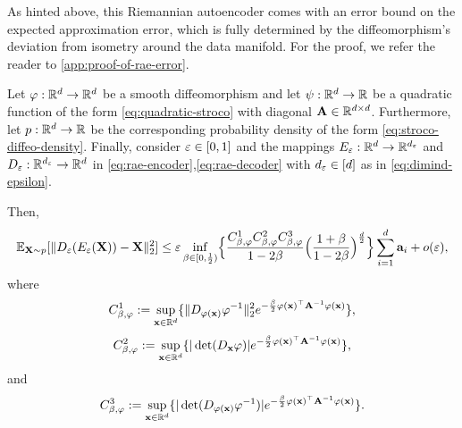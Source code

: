 As hinted above, this Riemannian autoencoder comes with an error bound on the expected approximation error, which is fully determined by the diffeomorphism’s deviation from isometry around the data manifold. For the proof, we refer the reader to \ref{app:proof-of-rae-error}.
\begin{theorem}
\label{thm:rae-error}
    Let $\varphi:\mathbb{R}^d \to \mathbb{R}^d$ be a smooth diffeomorphism and let $\psi: \mathbb{R}^d \to \mathbb{R}$ be a quadratic function of the form \ref{eq:quadratic-stroco} with diagonal $\mathbf{A} \in \mathbb{R}^{d\times d}$. Furthermore, let $p:\mathbb{R}^d \to\mathbb{R}$ be the corresponding probability density of the form \ref{eq:stroco-diffeo-density}. Finally, consider $\varepsilon\in [0,1]$ and the mappings $E_\varepsilon:\mathbb{R}^d \to \mathbb{R}^{d_\varepsilon}$ and $D_\varepsilon:\mathbb{R}^{d_\varepsilon} \to \mathbb{R}^d$ in \ref{eq:rae-encoder},\ref{eq:rae-decoder} with $d_\varepsilon \in [d]$ as in \ref{eq:dimind-epsilon}.

    Then, 
    \begin{equation}
        \mathbb{E}_{\mathbf{X} \sim p}[\| D_\varepsilon(E_\varepsilon(\mathbf{X}))-  \mathbf{X}\|_2^2] \leq \varepsilon \inf_{\beta\in [0,\frac{1}{2})}\Bigl\{  \frac{C^1_{\beta,\varphi} C^2_{\beta,\varphi} C^3_{\beta,\varphi}}{1 - 2\beta} \Bigl(\frac{1 + \beta}{1 - 2\beta} \Bigr)^{\frac{d}{2}} \Bigr\} \sum_{i=1}^{d} \mathbf{a}_{i} + o(\varepsilon),
        \label{eq:thm-rae-bound}
    \end{equation}
where 
\begin{equation}
    C^1_{\beta,\varphi} := \sup_{\mathbf{x}\in \mathbb{R}^{d}} \{ \| D_{\varphi(\mathbf{x})} \varphi^{-1}\|_2^2 e^{-\frac{\beta}{2} \varphi(\mathbf{x})^\top \mathbf{A}^{-1} \varphi(\mathbf{x}) } \},
    \label{eq:RAEinvdiffeoRegConstantB}
\end{equation}
\begin{equation}
    C^2_{\beta,\varphi} := \sup_{\mathbf{x}\in \mathbb{R}^{d}} \{ |\det (D_{\mathbf{x}} \varphi)| e^{-\frac{\beta}{2} \varphi(\mathbf{x})^\top \mathbf{A}^{-1} \varphi(\mathbf{x}) } \},
\end{equation}
and
\begin{equation}
    C^3_{\beta,\varphi} := \sup_{\mathbf{x}\in \mathbb{R}^{d}} \{ |\det (D_{\varphi(\mathbf{x})} \varphi^{-1})| e^{-\frac{\beta}{2} \varphi(\mathbf{x})^\top \mathbf{A}^{-1} \varphi(\mathbf{x}) } \}.
\end{equation}
\end{theorem}


